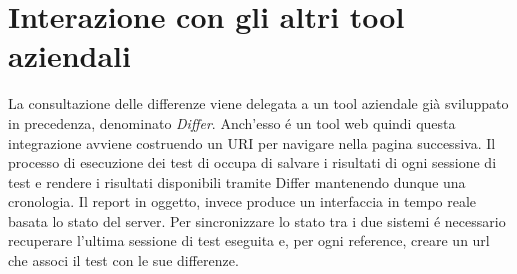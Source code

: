             \section{Interazione con gli altri tool aziendali}
                La consultazione delle differenze viene delegata a un tool aziendale già sviluppato in precedenza, denominato \textit{Differ}.
                Anch'esso \'e un tool web quindi questa integrazione avviene  costruendo un URI per navigare nella pagina successiva.
                Il processo di esecuzione dei test di occupa di salvare i risultati di ogni sessione di test e rendere i risultati disponibili tramite Differ mantenendo dunque una cronologia.
                Il report in oggetto, invece produce un interfaccia in tempo reale basata lo stato del server.
                Per sincronizzare lo stato tra i due sistemi \'e necessario recuperare l'ultima sessione di test eseguita e, per ogni reference, creare un url che associ il test con le sue differenze.